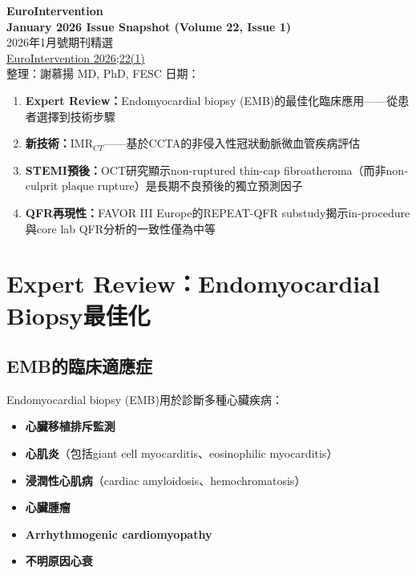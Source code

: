 \documentclass[12pt,a4paper]{article}
\begin{document}
\begin{center}
{\LARGE\bfseries\textcolor{emergency_red}{EuroIntervention}}\\[0.5cm]
{\Large\textbf{January 2026 Issue Snapshot (Volume 22, Issue 1)}}\\[0.3cm]
{\large 2026年1月號期刊精選}\\[0.5cm]
{\normalsize \href{https://eurointervention.pcronline.com/issue/volume-22/number-1}{EuroIntervention 2026;22(1)}}\\[0.3cm]
{\normalsize 整理：謝慕揚 MD, PhD, FESC \quad 日期：\mydate}
\end{center}

\vspace{0.5cm}

\begin{tcolorbox}[colback=yellow!10!white,colframe=orange!75!black,title=\textbf{本期核心重點}]
\begin{enumerate}
    \item \textbf{Expert Review：}Endomyocardial biopsy (EMB)的最佳化臨床應用——從患者選擇到技術步驟
    \item \textbf{新技術：}IMR$_{CT}$——基於CCTA的非侵入性冠狀動脈微血管疾病評估
    \item \textbf{STEMI預後：}OCT研究顯示non-ruptured thin-cap fibroatheroma（而非non-culprit plaque rupture）是長期不良預後的獨立預測因子
    \item \textbf{QFR再現性：}FAVOR III Europe的REPEAT-QFR substudy揭示in-procedure與core lab QFR分析的一致性僅為中等
\end{enumerate}
\end{tcolorbox}

\tableofcontents
\newpage

\section{Expert Review：Endomyocardial Biopsy最佳化}

\subsection{EMB的臨床適應症}

Endomyocardial biopsy (EMB)用於診斷多種心臟疾病：

\begin{itemize}
    \item \textbf{心臟移植排斥監測}
    \item \textbf{心肌炎}（包括giant cell myocarditis、eosinophilic myocarditis）
    \item \textbf{浸潤性心肌病}（cardiac amyloidosis、hemochromatosis）
    \item \textbf{心臟腫瘤}
    \item \textbf{Arrhythmogenic cardiomyopathy}
    \item \textbf{不明原因心衰}
\end{itemize}
\end{document}
